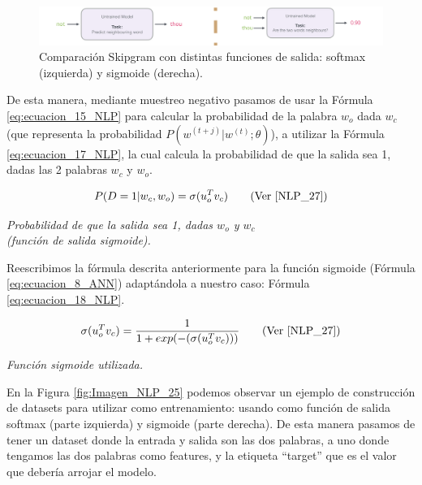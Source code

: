 \documentclass[12pt,a4paper]{article}
\begin{document}
\begin{sloppypar}
\begin{figure}[H]    
 \centering
 \includegraphics[width=1\textwidth]{images/NLP/24.png}
 \captionsetup{justification=centering,margin=2cm}
 \caption{Comparación Skipgram con distintas funciones de salida: softmax (izquierda) y sigmoide (derecha)\cite{datitos_nlp}.}
 \label{fig:Imagen_NLP_24}
\end{figure}

De esta manera, mediante muestreo negativo pasamos de usar la Fórmula \ref{eq:ecuacion_15_NLP} para calcular la probabilidad de la palabra $w_o$ dada $w_c$ (que representa la probabilidad $P(w^{(t+j)} | w^{(t)}; \theta)$), a utilizar la Fórmula \ref{eq:ecuacion_17_NLP}, la cual calcula la probabilidad de que la salida sea 1, dadas las 2 palabras $w_c$ y $w_o$.

\begin{equation}\label{eq:ecuacion_17_NLP}
P(D=1 | w_c, w_o) = \sigma (u_{o}^{T} v_c)    \qquad \text{(Ver \cite{NLP_27})}
\end{equation}
\begin{center}
\textit{Probabilidad de que la salida sea 1, dadas $w_o$ y $w_c$  \\ (función de salida sigmoide).}
\end{center}

Reescribimos la fórmula descrita anteriormente para la función sigmoide (Fórmula \ref{eq:ecuacion_8_ANN}) adaptándola a nuestro caso: Fórmula \ref{eq:ecuacion_18_NLP}.

\begin{equation}\label{eq:ecuacion_18_NLP}
\sigma (u_{o}^{T} v_c) = \frac{1}{1 + exp(- (\sigma (u_{o}^{T} v_c)) )}    \qquad \text{(Ver \cite{NLP_27})}
\end{equation}
\begin{center}
\textit{Función sigmoide utilizada.}
\end{center}

En la Figura \ref{fig:Imagen_NLP_25} podemos observar un ejemplo de construcción de datasets para utilizar como entrenamiento: usando como función de salida softmax (parte izquierda) y sigmoide (parte derecha). De esta manera pasamos de tener un dataset donde la entrada y salida son las dos palabras, a uno donde tengamos las dos palabras como features, y la etiqueta “target” que es el valor que debería arrojar el modelo.


\end{sloppypar}
\end{document}
